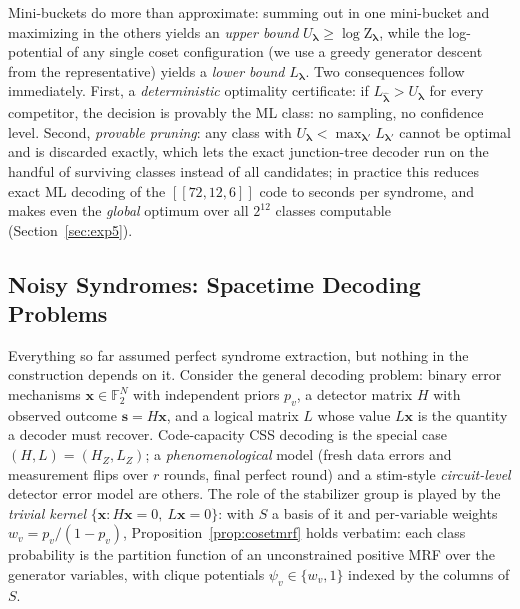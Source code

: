 \documentclass[a4paper,11pt]{quantumarticle}
\theoremstyle{definition}
\newcommand{\F}{\mathbb{F}}
\newcommand{\vx}{\boldsymbol{x}}
\newcommand{\vs}{\boldsymbol{s}}
\newcommand{\vlam}{\boldsymbol{\lambda}}
\newcommand{\Z}{\mathrm{Z}}
\begin{document}
Mini-buckets do more than approximate: summing out in one mini-bucket and
maximizing in the others yields an \emph{upper bound} $U_{\vlam}\ge
\log\Z_{\vlam}$, while the log-potential of any single coset
configuration (we use a greedy generator descent from the
representative) yields a \emph{lower bound} $L_{\vlam}$. Two consequences
follow immediately. First, a \emph{deterministic} optimality certificate:
if $L_{\hat{\vlam}} > U_{\vlam}$ for every competitor, the decision is
provably the ML class: no sampling, no confidence level. Second,
\emph{provable pruning}: any class with $U_{\vlam} < \max_{\vlam'}
L_{\vlam'}$ cannot be optimal and is discarded exactly, which lets the
exact junction-tree decoder run on the handful of surviving classes
instead of all candidates; in practice this reduces exact ML decoding of
the $[\![72,12,6]\!]$ code to seconds per syndrome, and makes even the
\emph{global} optimum over all $2^{12}$ classes computable
(Section~\ref{sec:exp5}).

\subsection{Noisy Syndromes: Spacetime Decoding Problems}
\label{sec:spacetime}
Everything so far assumed perfect syndrome extraction, but nothing in the
construction depends on it. Consider the general decoding problem: binary
error mechanisms $\vx\in\F_2^{N}$ with independent priors $p_v$, a detector
matrix $H$ with observed outcome $\vs=H\vx$, and a logical matrix $L$ whose
value $L\vx$ is the quantity a decoder must recover. Code-capacity CSS
decoding is the special case $(H,L)=(H_Z,L_Z)$; a \emph{phenomenological}
model (fresh data errors and measurement flips over $r$ rounds, final
perfect round) and a stim-style \emph{circuit-level} detector error model
are others. The role of the stabilizer group is played by the
\emph{trivial kernel} $\{\vx: H\vx=0,\ L\vx=0\}$: with $S$ a basis of it
and per-variable weights $w_v=p_v/(1-p_v)$, Proposition~\ref{prop:cosetmrf}
holds verbatim: each class probability is the partition function of an
unconstrained positive MRF over the generator variables, with clique
potentials $\psi_v\in\{w_v,1\}$ indexed by the columns of $S$.
\end{document}
